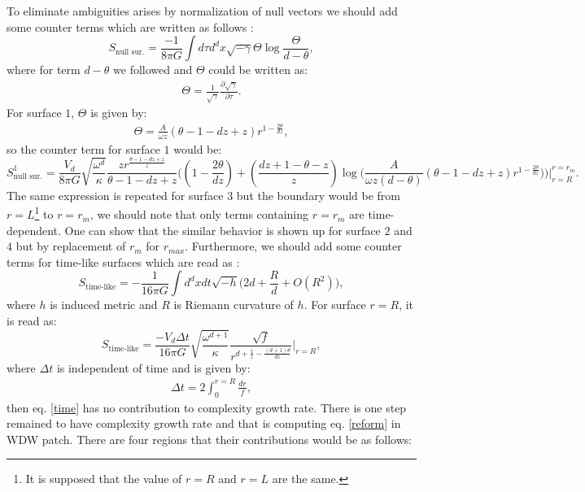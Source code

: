 \documentclass[]{article}
\begin{document}
To eliminate ambiguities arises by normalization of null vectors we should add some counter terms which are written as follows \cite{mya}:
\begin{equation}
S_{\text{null sur.}}=\frac{-1}{8\pi G}\int d\tau d^dx \sqrt{-\gamma} \Theta \log \frac{\Theta}{d-\theta},
\end{equation}
where for term $d-\theta$ we followed \cite{alish} and $\Theta$ could be written as:
\begin{align}
\Theta=\frac{1}{\sqrt{\gamma}}\frac{\partial \sqrt{\gamma}}{\partial \tau}.
\end{align}
For surface $1$, $\Theta$ is given by:
\begin{align}
\Theta=\frac{A}{\omega z}(\theta-1-dz+z) r^{1-\frac{2\theta}{dz}},
\end{align}
so the counter term for surface $1$ would be:
\begin{equation}
S_{\text{null sur.}}^1=\frac{V_d}{8\pi G}\sqrt{\frac{\omega^d}{\kappa}}\frac{z r^{\frac{\theta-1-dz+z}{z}}}{\theta-1-dz+z} \bigg((1-\frac{2\theta}{dz})+(\frac{dz+1-\theta-z}{z})\log \Big(\frac{A}{\omega z(d-\theta)}(\theta-1-dz+z)r^{1-\frac{2\theta}{dz}}\Big)\bigg)\Big|_{r=R}^{r=r_m}. \label{ns}
\end{equation}
The same expression is repeated for surface $3$ but the boundary would be from $r=L$\footnote{It is supposed that the value of $r=R$ and $r=L$ are the same.} to $r=r_m$, we should note that only terms containing $r=r_m$ are time-dependent. One can show that the similar behavior is shown up for surface $2$ and $4$ but by replacement of $r_m$ for $r_{max}$.
Furthermore, we should add some counter terms for time-like surfaces which are read as \cite{sken}:
\begin{equation}
S_{\text{time-like}}=-\frac{1}{16\pi G}\int d^dx dt\sqrt{-h}\Big(2d+\frac{R}{d}+O(R^2)\Big),
\end{equation}
where $h$ is induced metric and $R$ is Riemann curvature of $h$. For surface $r=R$, it is read as:
\begin{equation}
S_{\text{time-like}}=\frac{-V_d \Delta t}{16\pi G} \sqrt{\frac{\omega^{d+1}}{\kappa}}\frac{\sqrt{f}}{r^{d+\frac{1}{z}-\frac{(d+1)\theta}{dz}}}\Big|_{r=R},\label{time}
\end{equation}
where $\Delta t$ is independent of time and is given by:
\begin{align}
\Delta t=2\int_0^{r=R}\frac{dr}{f},
\end{align}
then eq. \eqref{time} has no contribution to complexity growth rate. There is one step remained to have complexity growth rate and that is computing eq. \eqref{reform} in WDW patch. There are four regions that their contributions would be as follows:
\end{document}

